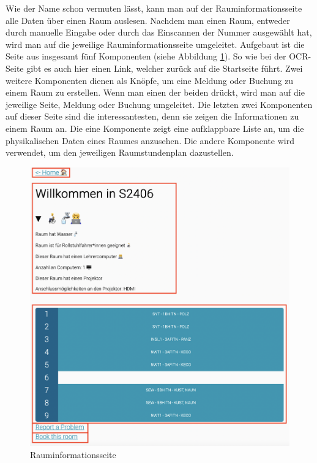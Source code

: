 
Wie der Name schon vermuten lässt, kann man auf der Rauminformationsseite alle Daten über einen Raum auslesen. Nachdem man einen Raum, entweder durch manuelle Eingabe oder durch das Einscannen der Nummer ausgewählt hat, wird man auf die jeweilige Rauminformationsseite umgeleitet. Aufgebaut ist die Seite aus insgesamt fünf Komponenten (siehe Abbildung \ref{fig:roominfoframes}). So wie bei der OCR-Seite gibt es auch hier einen Link, welcher zurück auf die Startseite führt. Zwei weitere Komponenten dienen als Knöpfe, um eine Meldung oder Buchung zu einem Raum zu erstellen. Wenn man einen der beiden drückt, wird man auf die jeweilige Seite, Meldung oder Buchung umgeleitet. Die letzten zwei Komponenten auf dieser Seite sind die interessantesten, denn sie zeigen die Informationen zu einem Raum an. Die eine Komponente zeigt eine aufklappbare Liste an, um die physikalischen Daten eines Raumes anzusehen. Die andere Komponente wird verwendet, um den jeweiligen Raumstundenplan dazustellen.

\begin{figure}[H]
    \centering
    \includegraphics[width=120mm]{media/WebComponents/Rauminformationsseite_frames.png}
    \caption{Rauminformationsseite}
    \label{fig:roominfoframes}
\end{figure}

